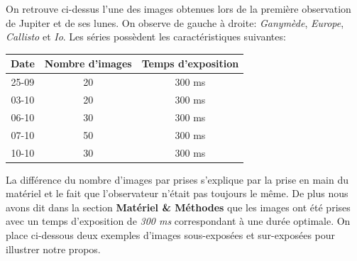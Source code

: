\documentclass{aa}
\begin{document}
On retrouve ci-dessus l'une des images obtenues lors de la première observation de Jupiter et de ses lunes. On observe de gauche à droite: \textit{Ganymède}, \textit{Europe}, \textit{Callisto} et \textit{Io}. Les séries possèdent les caractéristiques suivantes: \\

\begin{center}
        \begin{tabular}{|c|c|c|}
        \hline
           Date & Nombre d'images & Temps d'exposition   \\
        \hline
           25-09 & 20 & 300 ms \\
        \hline
            03-10 & 20 & 300 ms  \\
        \hline
            06-10 & 30 & 300 ms  \\
        \hline 
            07-10 & 50 & 300 ms \\
        \hline
            10-10 & 30 & 300 ms \\
        \hline
        \end{tabular}
\end{center}

        La différence du nombre d'images par prises s'explique par la prise en main du matériel et le fait que l'observateur n'était pas toujours le même. De plus nous avons dit dans la section \textbf{Matériel \& Méthodes} que les images ont été prises avec un temps d'exposition de \textit{300 ms} correspondant à une durée optimale. On place ci-dessous deux exemples d'images sous-exposées et sur-exposées pour illustrer notre propos.
\end{document}
